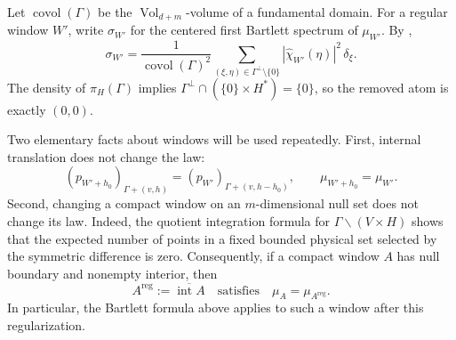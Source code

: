 \documentclass[11pt,reqno,a4paper]{amsart}
\numberwithin{equation}{section}
\theoremstyle{compact}
\theoremstyle{definition}
\theoremstyle{definition}
\newcommand{\Vol}{\operatorname{Vol}}
\begin{document}
Let $\operatorname{covol}(\Gamma)$ be the $\Vol_{d+m}$-volume of a
fundamental domain.  For a regular window $W'$, write $\sigma_{W'}$ for the
centered first Bartlett spectrum of $\mu_{W'}$.  By
\cite[Theorem~2.9]{BH24},
\begin{equation}\label{eq:cap-diffraction-formula}
  \sigma_{W'}
  =\frac{1}{\operatorname{covol}(\Gamma)^2}
   \sum_{(\xi,\eta)\in\Gamma^\perp\setminus\{0\}}
     |\widehat{\chi}_{W'}(\eta)|^2\,\delta_\xi.
\end{equation}
The density of $\pi_H(\Gamma)$ implies
$\Gamma^\perp\cap(\{0\}\times H^*)=\{0\}$, so the removed atom is exactly
$(0,0)$.

Two elementary facts about windows will be used repeatedly.  First, internal
translation does not change the law:
\begin{equation}\label{eq:cap-window-translation-law}
  (p_{W'+h_0})_{\Gamma+(v,h)}
  =(p_{W'})_{\Gamma+(v,h-h_0)},
  \qquad
  \mu_{W'+h_0}=\mu_{W'}.
\end{equation}
Second, changing a compact window on an $m$-dimensional null set does not
change its law.  Indeed, the quotient integration formula for
$\Gamma\backslash(V\times H)$ shows that the expected number of points in a
fixed bounded physical set selected by the symmetric difference is zero.
Consequently, if a compact window $A$ has null boundary and nonempty
interior, then
\begin{equation}\label{eq:cap-window-regularization}
  A^{\mathrm{reg}}:=\overline{\operatorname{int}A}
  \quad\text{satisfies}\quad
  \mu_A=\mu_{A^{\mathrm{reg}}}.
\end{equation}
In particular, the Bartlett formula above applies to such a window after this
regularization.
\end{document}
